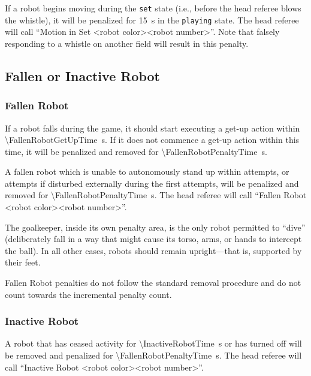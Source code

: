 If a robot begins moving during the \texttt{set} state (i.e., before the head referee blows the whistle), it will be penalized for \qty{15}{\second} in the \texttt{playing} state. The head referee will call ``Motion in Set \textless robot color\textgreater \textless robot number\textgreater''. Note that falsely responding to a whistle on another field will result in this penalty.

\subsection{Fallen or Inactive Robot}
\label{sec:fallen_robot}

\subsubsection{Fallen Robot}

If a robot falls during the game, it should start executing a get-up action within \qty{\FallenRobotGetUpTime}{\second}. If it does not commence a get-up action within this time, it will be penalized and removed for \qty{\FallenRobotPenaltyTime}{\second}.

A fallen robot which is unable to autonomously stand up within \FallenRobotGetUpAttempts{} attempts, or \FallenRobotGetUpAttemptsDisturbed{} attempts if disturbed externally during the first attempts, will be penalized and removed for \qty{\FallenRobotPenaltyTime}{\second}. The head referee will call ``Fallen Robot \textless robot color\textgreater \textless robot number\textgreater''.

The goalkeeper, inside its own penalty area, is the only robot permitted to ``dive'' (deliberately fall in a way that might cause its torso, arms, or hands to intercept the ball). In all other cases, robots should remain upright—that is, supported by their feet.

Fallen Robot penalties do not follow the standard removal procedure and do not count towards the incremental penalty count.

\subsubsection{Inactive Robot}

A robot that has ceased activity for \qty{\InactiveRobotTime}{\second} or has turned off will be removed and penalized for \qty{\FallenRobotPenaltyTime}{\second}. The head referee will call ``Inactive Robot \textless robot color\textgreater \textless robot number\textgreater''.

